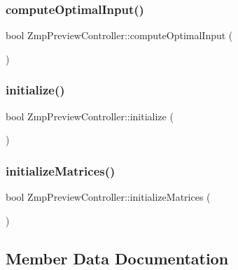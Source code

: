 \subsubsection{\texorpdfstring{compute\+Optimal\+Input()}{computeOptimalInput()}}
{\footnotesize\ttfamily bool Zmp\+Preview\+Controller\+::compute\+Optimal\+Input (\begin{DoxyParamCaption}{ }\end{DoxyParamCaption})}

\hypertarget{classZmpPreviewController_ac28287e01187bff2cea5a68292d936bd}{}\label{classZmpPreviewController_ac28287e01187bff2cea5a68292d936bd} 
\subsubsection{\texorpdfstring{initialize()}{initialize()}}
{\footnotesize\ttfamily bool Zmp\+Preview\+Controller\+::initialize (\begin{DoxyParamCaption}{ }\end{DoxyParamCaption})}

\hypertarget{classZmpPreviewController_a65905572c73752a3ff46c0435c9794a0}{}\label{classZmpPreviewController_a65905572c73752a3ff46c0435c9794a0} 
\subsubsection{\texorpdfstring{initialize\+Matrices()}{initializeMatrices()}}
{\footnotesize\ttfamily bool Zmp\+Preview\+Controller\+::initialize\+Matrices (\begin{DoxyParamCaption}{ }\end{DoxyParamCaption})}



\subsection{Member Data Documentation}
\hypertarget{classZmpPreviewController_a777600c57020a9851912374cfc12ad5a}{}\label{classZmpPreviewController_a777600c57020a9851912374cfc12ad5a} 

